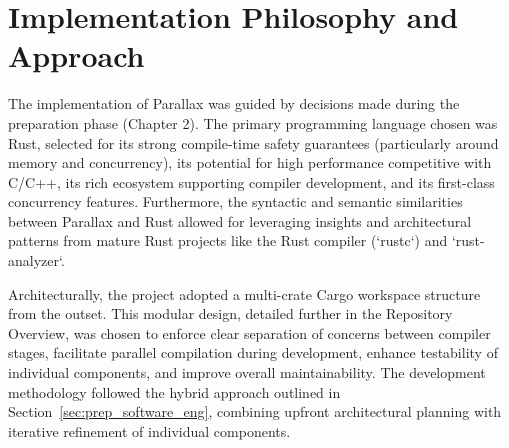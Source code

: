 \section{Implementation Philosophy and Approach}
The implementation of Parallax was guided by decisions made during the preparation phase (Chapter 2). The primary programming language chosen was Rust, selected for its strong compile-time safety guarantees (particularly around memory and concurrency), its potential for high performance competitive with C/C++, its rich ecosystem supporting compiler development, and its first-class concurrency features. Furthermore, the syntactic and semantic similarities between Parallax and Rust allowed for leveraging insights and architectural patterns from mature Rust projects like the Rust compiler (`rustc`) and `rust-analyzer`.

Architecturally, the project adopted a multi-crate Cargo workspace structure from the outset. This modular design, detailed further in the Repository Overview, was chosen to enforce clear separation of concerns between compiler stages, facilitate parallel compilation during development, enhance testability of individual components, and improve overall maintainability. The development methodology followed the hybrid approach outlined in Section~\ref{sec:prep_software_eng}, combining upfront architectural planning with iterative refinement of individual components.


